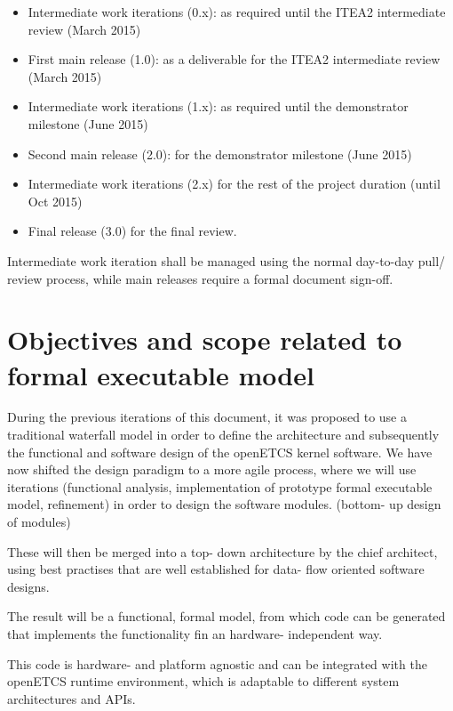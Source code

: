 \begin{itemize}
\item Intermediate work iterations (0.x): as required until the ITEA2 intermediate review (March 2015)

\item First main release (1.0): as a deliverable for the ITEA2 intermediate review (March 2015)

\item Intermediate work iterations (1.x): as required until the demonstrator milestone (June 2015)

\item Second main release (2.0): for the demonstrator milestone (June 2015)

\item Intermediate work iterations (2.x) for the rest of the project duration (until Oct 2015)

\item  Final release (3.0) for the final review.
\end{itemize}

Intermediate work iteration shall be managed using the normal day-to-day pull/ review process, while main releases require a formal document sign-off.


\section{Objectives and scope related to formal executable model}

During the previous iterations of this document, it was proposed to use a traditional waterfall model in order to define the architecture and subsequently the functional and software design of the openETCS kernel software. We have now shifted the design paradigm to a more agile process, where we will use iterations (functional analysis, implementation of prototype formal executable model, refinement) in order to design the software modules. (bottom- up design of modules)

These will then be merged into a top- down architecture by the chief architect, using best practises that are well established for data- flow oriented software designs.

The result will be a functional, formal model, from which code can be generated that implements the functionality fin an hardware- independent way.

This code is hardware- and platform agnostic and can be integrated with the openETCS runtime environment, which is adaptable to different system architectures and APIs.




